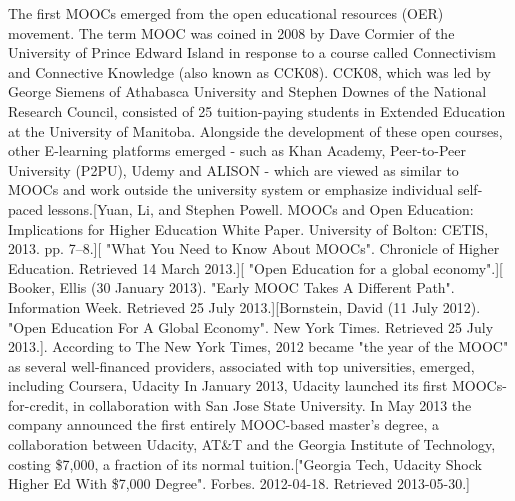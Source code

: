 The first MOOCs emerged from the open educational resources (OER) movement. The term MOOC was coined in 2008 by Dave Cormier of the University of Prince Edward Island in response to a course called Connectivism and Connective Knowledge (also known as CCK08). CCK08, which was led by George Siemens of Athabasca University and Stephen Downes of the National Research Council, consisted of 25 tuition-paying students in Extended Education at the University of Manitoba.
Alongside the development of these open courses, other E-learning platforms emerged - such as Khan Academy, Peer-to-Peer University (P2PU), Udemy and ALISON - which are viewed as similar to MOOCs and work outside the university system or emphasize individual self-paced lessons.[Yuan, Li, and Stephen Powell. MOOCs and Open Education: Implications for Higher Education White Paper. University of Bolton: CETIS, 2013. pp. 7–8.][ "What You Need to Know About MOOCs". Chronicle of Higher Education. Retrieved 14 March 2013.][ "Open Education for a global economy".][ Booker, Ellis (30 January 2013). "Early MOOC Takes A Different Path". Information Week. Retrieved 25 July 2013.][Bornstein, David (11 July 2012). "Open Education For A Global Economy". New York Times. Retrieved 25 July 2013.].
According to The New York Times, 2012 became "the year of the MOOC" as several well-financed providers, associated with top universities, emerged, including Coursera, Udacity
In January 2013, Udacity launched its first MOOCs-for-credit, in collaboration with San Jose State University. In May 2013 the company announced the first entirely MOOC-based master's degree, a collaboration between Udacity, AT\&T and the Georgia Institute of Technology, costing \$7,000, a fraction of its normal tuition.["Georgia Tech, Udacity Shock Higher Ed With \$7,000 Degree". Forbes. 2012-04-18. Retrieved 2013-05-30.]





